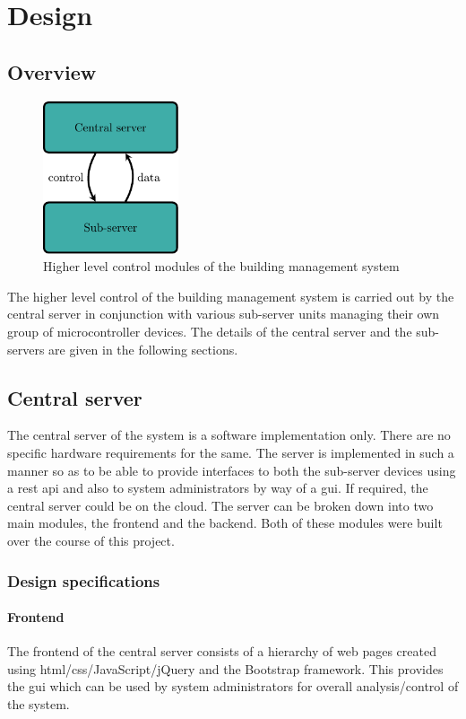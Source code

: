 \documentclass[letterpaper,11pt]{report}
\begin{document}
\newpage
\chapter{Design}\label{chapter:Design}
\onehalfspacing
\section{Overview}
\begin{figure}[h]
\includegraphics[width=4cm, height=4.5cm]{des}
\centering
\captionsetup{justification=centering}
\caption{Higher level control modules of the building management system}
\label{fig:des}
\end{figure}
The higher level control of the building management system is carried out by the central server in conjunction with various sub-server units managing their own group of microcontroller devices. The details of the central server and the sub-servers are given in the following sections.
\section{Central server}
The central server of the system is a software implementation only. There are no specific hardware requirements for the same. The server is implemented in such a manner so as to be able to provide interfaces to both the sub-server devices using a \ac{rest} \ac{api} and also to system administrators by way of a \ac{gui}. If required, the central server could be on the cloud. The server can be broken down into two main modules, the frontend and the backend. Both of these modules were built over the course of this project.
\subsection{Design specifications}
\subsubsection{Frontend}
The frontend of the central server consists of a hierarchy of web pages created using \ac{html}/\newline \ac{css}/JavaScript/jQuery and the Bootstrap framework. This provides the \ac{gui} which can be used by system administrators for overall analysis/control of the system.
\end{document}
